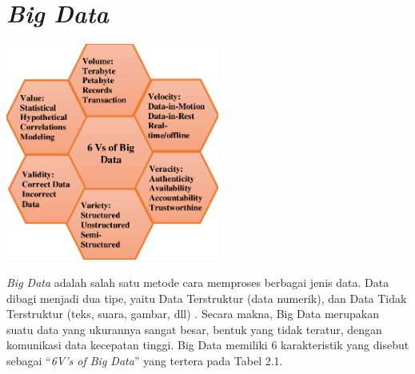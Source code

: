 \documentclass[12pt,a4paper]{report}
\begin{document}
	\section{\textit{Big Data}}
	
	\begin{center}
		\includegraphics[width=7cm]{gambar/bigdat.png}
	\end{center}

	\textit{Big Data} adalah salah satu metode cara memproses berbagai jenis data. Data dibagi menjadi dua tipe, yaitu Data Terstruktur (data numerik), dan Data Tidak Terstruktur (teks, suara, gambar, dll) \cite{Shakhovska2019}. Secara makna, Big Data merupakan suatu data yang ukurannya sangat besar, bentuk yang tidak teratur, dengan komunikasi data kecepatan tinggi. Big Data memiliki 6 karakteristik yang disebut sebagai “\textit{6V’s of Big Data}” yang tertera pada Tabel 2.1.
	
\end{document}
